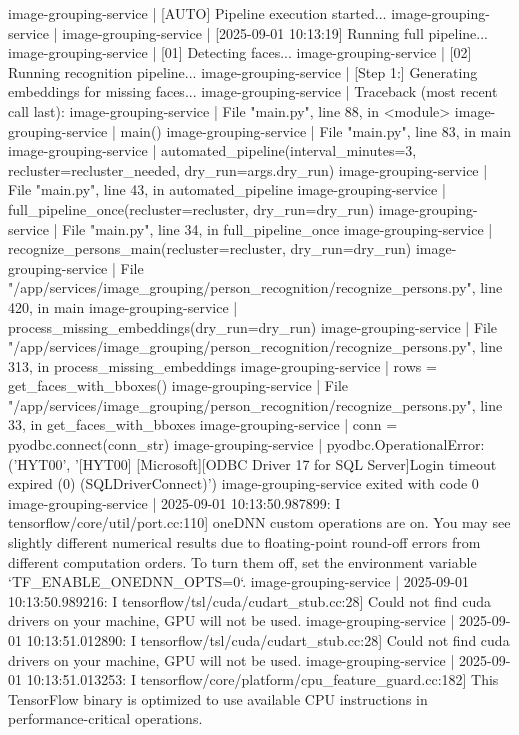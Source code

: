 image-grouping-service  | [AUTO] Pipeline execution started...
image-grouping-service  |
image-grouping-service  | [2025-09-01 10:13:19] Running full pipeline...
image-grouping-service  | [01] Detecting faces...
image-grouping-service  | [02] Running recognition pipeline...
image-grouping-service  | [Step 1:] Generating embeddings for missing faces...
image-grouping-service  | Traceback (most recent call last):
image-grouping-service  |   File "main.py", line 88, in <module>
image-grouping-service  |     main()
image-grouping-service  |   File "main.py", line 83, in main
image-grouping-service  |     automated_pipeline(interval_minutes=3, recluster=recluster_needed, dry_run=args.dry_run)
image-grouping-service  |   File "main.py", line 43, in automated_pipeline
image-grouping-service  |     full_pipeline_once(recluster=recluster, dry_run=dry_run)
image-grouping-service  |   File "main.py", line 34, in full_pipeline_once
image-grouping-service  |     recognize_persons_main(recluster=recluster, dry_run=dry_run)
image-grouping-service  |   File "/app/services/image_grouping/person_recognition/recognize_persons.py", line 420, in main
image-grouping-service  |     process_missing_embeddings(dry_run=dry_run)
image-grouping-service  |   File "/app/services/image_grouping/person_recognition/recognize_persons.py", line 313, in process_missing_embeddings
image-grouping-service  |     rows = get_faces_with_bboxes()
image-grouping-service  |   File "/app/services/image_grouping/person_recognition/recognize_persons.py", line 33, in get_faces_with_bboxes
image-grouping-service  |     conn = pyodbc.connect(conn_str)
image-grouping-service  | pyodbc.OperationalError: ('HYT00', '[HYT00] [Microsoft][ODBC Driver 17 for SQL Server]Login timeout expired (0) (SQLDriverConnect)')
image-grouping-service exited with code 0
image-grouping-service  | 2025-09-01 10:13:50.987899: I tensorflow/core/util/port.cc:110] oneDNN custom operations are on. You may see slightly different numerical results due to floating-point round-off errors from different computation orders. To turn them off, set the environment variable `TF_ENABLE_ONEDNN_OPTS=0`.
image-grouping-service  | 2025-09-01 10:13:50.989216: I tensorflow/tsl/cuda/cudart_stub.cc:28] Could not find cuda drivers on your machine, GPU will not be used.
image-grouping-service  | 2025-09-01 10:13:51.012890: I tensorflow/tsl/cuda/cudart_stub.cc:28] Could not find cuda drivers on your machine, GPU will not be used.
image-grouping-service  | 2025-09-01 10:13:51.013253: I tensorflow/core/platform/cpu_feature_guard.cc:182] This TensorFlow binary is optimized to use available CPU instructions in performance-critical operations.

